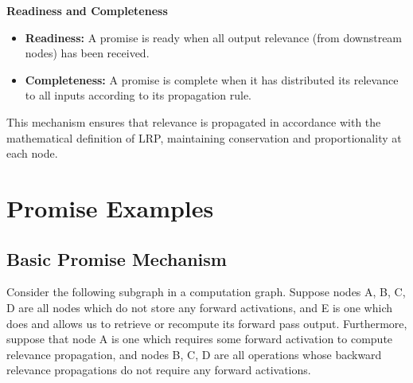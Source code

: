 \documentclass{article}
\begin{document}
\textbf{Readiness and Completeness}
\begin{itemize}
  \item \textbf{Readiness:} A promise is ready when all output relevance (from downstream nodes) has been received.
  \item \textbf{Completeness:} A promise is complete when it has distributed its relevance to all inputs according to its propagation rule.
\end{itemize}

This mechanism ensures that relevance is propagated in accordance with the mathematical definition of LRP, maintaining conservation and proportionality at each node.

\section{Promise Examples}
\subsection{Basic Promise Mechanism}
\label{appendix:basic-promise-example}
Consider the following subgraph in a computation graph. Suppose nodes A, B, C, D are all nodes which do not store
any forward activations, and E is one which does and allows us to retrieve or recompute its forward pass output.
Furthermore, suppose that node A is one which requires some forward activation to compute relevance propagation,
and nodes B, C, D are all operations whose backward relevance propagations do not require any forward activations.

\vspace{0.7cm}
\begin{center}
\end{center}
\vspace{0.3cm}
\end{document}
